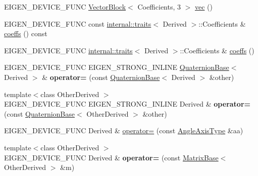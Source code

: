 \begin{DoxyCompactItemize}
E\+I\+G\+E\+N\+\_\+\+D\+E\+V\+I\+C\+E\+\_\+\+F\+U\+NC \mbox{\hyperlink{class_eigen_1_1_vector_block}{Vector\+Block}}$<$ Coefficients, 3 $>$ \mbox{\hyperlink{class_eigen_1_1_quaternion_base_abc489fa38de6a3c22402101fa0e89342}{vec}} ()
\item 
E\+I\+G\+E\+N\+\_\+\+D\+E\+V\+I\+C\+E\+\_\+\+F\+U\+NC const \mbox{\hyperlink{struct_eigen_1_1internal_1_1traits}{internal\+::traits}}$<$ Derived $>$\+::Coefficients \& \mbox{\hyperlink{class_eigen_1_1_quaternion_base_aa7bb3fc337ffa82b0ad795783eb8a2ce}{coeffs}} () const
\item 
E\+I\+G\+E\+N\+\_\+\+D\+E\+V\+I\+C\+E\+\_\+\+F\+U\+NC \mbox{\hyperlink{struct_eigen_1_1internal_1_1traits}{internal\+::traits}}$<$ Derived $>$\+::Coefficients \& \mbox{\hyperlink{class_eigen_1_1_quaternion_base_afae737227fb9fb3f3c674cd1fccb4de0}{coeffs}} ()
\item 
\mbox{\label{class_eigen_1_1_quaternion_base_a46e23d76f614c1636fdd9770e5942d17}} 
E\+I\+G\+E\+N\+\_\+\+D\+E\+V\+I\+C\+E\+\_\+\+F\+U\+NC E\+I\+G\+E\+N\+\_\+\+S\+T\+R\+O\+N\+G\+\_\+\+I\+N\+L\+I\+NE \mbox{\hyperlink{class_eigen_1_1_quaternion_base}{Quaternion\+Base}}$<$ Derived $>$ \& {\bfseries operator=} (const \mbox{\hyperlink{class_eigen_1_1_quaternion_base}{Quaternion\+Base}}$<$ Derived $>$ \&other)
\item 
\mbox{\label{class_eigen_1_1_quaternion_base_a6ecee1e714696552a0aeb07e5d6f7f3f}} 
{\footnotesize template$<$class Other\+Derived $>$ }\\E\+I\+G\+E\+N\+\_\+\+D\+E\+V\+I\+C\+E\+\_\+\+F\+U\+NC E\+I\+G\+E\+N\+\_\+\+S\+T\+R\+O\+N\+G\+\_\+\+I\+N\+L\+I\+NE Derived \& {\bfseries operator=} (const \mbox{\hyperlink{class_eigen_1_1_quaternion_base}{Quaternion\+Base}}$<$ Other\+Derived $>$ \&other)
\item 
E\+I\+G\+E\+N\+\_\+\+D\+E\+V\+I\+C\+E\+\_\+\+F\+U\+NC Derived \& \mbox{\hyperlink{class_eigen_1_1_quaternion_base_af2f49bb475fcfd4965803787c8784d13}{operator=}} (const \mbox{\hyperlink{class_eigen_1_1_quaternion_base_aed266c63b10a4028304901d9c8614199}{Angle\+Axis\+Type}} \&aa)
\item 
\mbox{\label{class_eigen_1_1_quaternion_base_a81bc7f2784dc37e21f26e5154d69527b}} 
{\footnotesize template$<$class Other\+Derived $>$ }\\E\+I\+G\+E\+N\+\_\+\+D\+E\+V\+I\+C\+E\+\_\+\+F\+U\+NC Derived \& {\bfseries operator=} (const \mbox{\hyperlink{class_eigen_1_1_matrix_base}{Matrix\+Base}}$<$ Other\+Derived $>$ \&m)

\end{DoxyCompactItemize}
